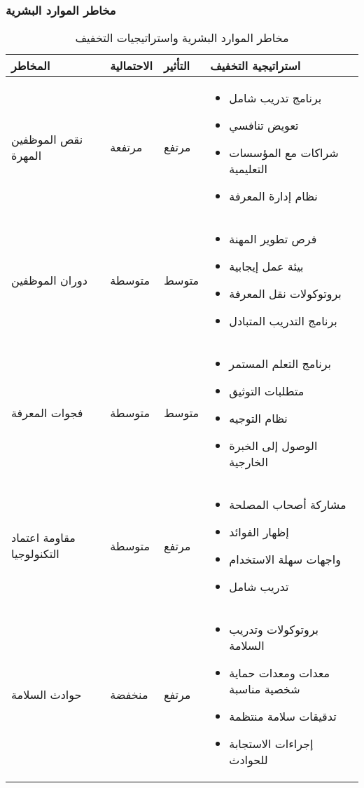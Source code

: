 \subsubsection{مخاطر الموارد البشرية}
\begin{table}[H]
\centering
\begin{tabular}{|p{3cm}|p{2cm}|p{2cm}|p{7cm}|}
\hline
\textbf{المخاطر} & \textbf{الاحتمالية} & \textbf{التأثير} & \textbf{استراتيجية التخفيف} \\
\hline
نقص الموظفين المهرة & مرتفعة & مرتفع & 
\begin{itemize}
    \item برنامج تدريب شامل
    \item تعويض تنافسي
    \item شراكات مع المؤسسات التعليمية
    \item نظام إدارة المعرفة
\end{itemize} \\
\hline
دوران الموظفين & متوسطة & متوسط & 
\begin{itemize}
    \item فرص تطوير المهنة
    \item بيئة عمل إيجابية
    \item بروتوكولات نقل المعرفة
    \item برنامج التدريب المتبادل
\end{itemize} \\
\hline
فجوات المعرفة & متوسطة & متوسط & 
\begin{itemize}
    \item برنامج التعلم المستمر
    \item متطلبات التوثيق
    \item نظام التوجيه
    \item الوصول إلى الخبرة الخارجية
\end{itemize} \\
\hline
مقاومة اعتماد التكنولوجيا & متوسطة & مرتفع & 
\begin{itemize}
    \item مشاركة أصحاب المصلحة
    \item إظهار الفوائد
    \item واجهات سهلة الاستخدام
    \item تدريب شامل
\end{itemize} \\
\hline
حوادث السلامة & منخفضة & مرتفع & 
\begin{itemize}
    \item بروتوكولات وتدريب السلامة
    \item معدات ومعدات حماية شخصية مناسبة
    \item تدقيقات سلامة منتظمة
    \item إجراءات الاستجابة للحوادث
\end{itemize} \\
\hline
\end{tabular}
\caption{مخاطر الموارد البشرية واستراتيجيات التخفيف}
\end{table}

